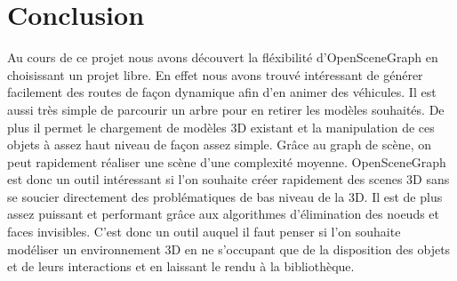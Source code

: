 \documentclass[a4paper, 11pt]{report}
\begin{document}
  \section*{Conclusion} 
  Au cours de ce projet nous avons découvert la fléxibilité d'OpenSceneGraph en choisissant un projet libre.
  En effet nous avons trouvé intéressant de générer facilement des routes de façon dynamique afin d'en
  animer des véhicules. Il est aussi très simple de parcourir un arbre pour en retirer les modèles souhaités.
  De plus il permet le chargement de modèles 3D existant et la manipulation de ces objets à assez haut 
  niveau de façon assez simple. Grâce au graph de scène, on peut rapidement réaliser une scène d'une 
  complexité moyenne. OpenSceneGraph est donc un outil intéressant si l'on souhaite créer rapidement des 
  scenes 3D sans se soucier directement des problématiques de bas niveau de la 3D. Il est de plus assez 
  puissant et performant grâce aux algorithmes d'élimination des noeuds et faces invisibles. C'est donc un 
  outil auquel il faut penser si l'on souhaite modéliser un environnement 3D en ne s'occupant que de la 
  disposition des objets et de leurs interactions et en laissant le rendu à la bibliothèque.
\end{document}
